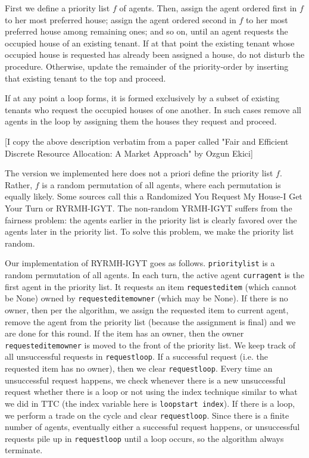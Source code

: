\documentclass[12pt]{article}
\begin{document}
First we define a priority list $f$ of agents. Then, assign the agent ordered first in $f$ to her most preferred house; assign the agent ordered second in $f$ to her most preferred house among remaining ones; and so on, until an agent requests the occupied house of
an existing tenant. If at that point the existing tenant whose occupied house is requested
has already been assigned a house, do not disturb the procedure. Otherwise, update the remainder of the priority-order by inserting that existing tenant to the top and proceed.

If at any point a loop forms, it is formed exclusively by a subset of existing tenants who
request the occupied houses of one another. In such cases remove all agents in the loop
by assigning them the houses they request and proceed.

[I copy the above description verbatim from a paper called "Fair and Efficient Discrete Resource Allocation: A Market Approach" by Ozgun Ekici]

The version we implemented here does not a priori define the priority list $f$. Rather, $f$ is a random permutation of all agents, where each permutation is equally likely. Some sources call this a Randomized You Request My House-I Get Your Turn or RYRMH-IGYT. The non-random YRMH-IGYT suffers from the fairness problem: the agents earlier in the priority list is clearly favored over the agents later in the priority list. To solve this problem, we make the priority list random.

Our implementation of RYRMH-IGYT goes as follows. \texttt{priority\textunderscore list} is a random permutation of all agents. In each turn, the active agent \texttt{curr\textunderscore agent} is the first agent in the priority list. It requests an item \texttt{requested\textunderscore item} (which cannot be None) owned by \texttt{requested\textunderscore item\textunderscore owner} (which may be None). If there is no owner, then per the algorithm, we assign the requested item to current agent, remove the agent from the priority list (because the assignment is final) and we are done for this round. If the item has an owner, then the owner \texttt{requested\textunderscore item\textunderscore owner} is moved to the front of the priority list. We keep track of all unsuccessful requests in \texttt{request\textunderscore loop}. If a successful request (i.e. the requested item has no owner), then we clear \texttt{request\textunderscore loop}. Every time an unsuccessful request happens, we check whenever there is a new unsuccessful request whether there is a loop or not using the index technique similar to what we did in TTC (the index variable here is \texttt{loop\textunderscore start \textunderscore index}). If there is a loop, we perform a trade on the cycle and clear \texttt{request\textunderscore loop}. Since there is a finite number of agents, eventually either a successful request happens, or unsuccessful requests pile up in \texttt{request\textunderscore loop} until a loop occurs, so the algorithm always terminate.
\end{document}
